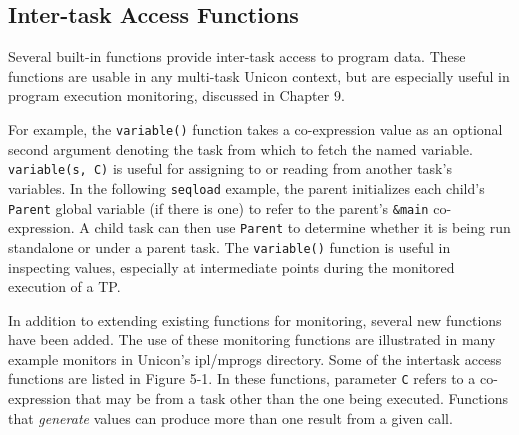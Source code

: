 \subsection{Inter-task Access Functions}

Several built-in functions
provide inter-task access to program data.  These functions
are usable in any multi-task Unicon context, but are especially
useful in program execution monitoring, discussed in Chapter 9.

For example, the
{\tt variable()} function takes a co-expression value as an
optional second argument denoting the task from which to fetch the named
variable. {\tt variable(s, C)} is
useful for assigning to or reading from another task's
variables. In the following {\tt seqload} example, the
parent initializes each child's {\tt Parent} global
variable (if there is one) to refer to the parent's {\tt \&main}
co-expression.  A child task can then use {\tt Parent} to determine
whether it is being run standalone or under a parent task.
The {\tt variable()} function is
useful in inspecting values, especially at intermediate points during
the monitored execution of a TP.


In addition to extending existing functions for monitoring,
several new functions have been added.  The use of these monitoring functions
are illustrated in many example monitors in Unicon's
ipl/mprogs directory.  Some of the intertask access functions
are listed in Figure 5-1.  In these functions, parameter {\tt C}
refers to a co-expression that may be from a task other than the one being
executed.  Functions that {\em generate\/}
values can produce more than one result from a given call.

